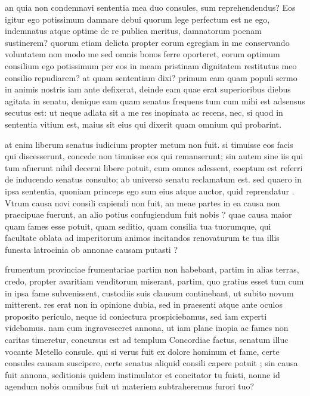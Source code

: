  an quia non condemnavi sententia mea duo consules, sum reprehendendus? Eos igitur ego potissimum damnare debui quorum lege perfectum est ne ego, indemnatus atque optime de re publica meritus, damnatorum poenam sustinerem? quorum etiam delicta propter eorum egregiam in me conservando voluntatem non modo me sed omnis bonos ferre oporteret, eorum optimum consilium ego potissimum per eos in meam pristinam dignitatem restitutus meo consilio repudiarem? at quam sententiam dixi? primum eam quam populi sermo in animis nostris iam ante defixerat, deinde eam quae erat superioribus diebus agitata in senatu, denique eam quam senatus frequens tum cum mihi est adsensus secutus est: ut neque adlata sit a me res inopinata ac recens, nec, si quod in sententia vitium est, maius sit eius qui dixerit quam omnium qui probarint.

 at enim liberum senatus iudicium propter metum non fuit. si timuisse eos facis qui discesserunt, concede non timuisse eos qui remanserunt; sin autem sine iis qui tum afuerunt nihil decerni libere potuit, cum omnes adessent, coeptum est referri de inducendo senatus consulto; ab universo senatu reclamatum est. sed quaero in ipsa sententia, quoniam princeps ego sum eius atque auctor, quid reprendatur . Vtrum causa novi consili capiendi non fuit, an meae partes in ea causa non praecipuae fuerunt, an alio potius confugiendum fuit nobis ? quae causa maior quam fames esse potuit, quam seditio, quam consilia tua tuorumque, qui facultate oblata ad imperitorum animos incitandos renovaturum te tua illis funesta latrocinia ob annonae causam putasti ?

 frumentum provinciae frumentariae partim non habebant, partim in alias terras, credo, propter avaritiam venditorum miserant, partim, quo gratius esset tum cum in ipsa fame subvenissent, custodiis suis clausum continebant, ut subito novum mitterent. res erat non in opinione dubia, sed in praesenti atque ante oculos proposito periculo, neque id coniectura prospiciebamus, sed iam experti videbamus. nam cum ingravesceret annona, ut iam plane inopia ac fames non caritas timeretur, concursus est ad templum Concordiae factus, senatum illuc vocante Metello consule. qui si verus fuit ex dolore hominum et fame, certe consules causam suscipere, certe senatus aliquid consili capere potuit ; sin causa fuit annona, seditionis quidem instimulator et concitator tu fuisti, nonne id agendum nobis omnibus fuit ut materiem subtraheremus furori tuo?

